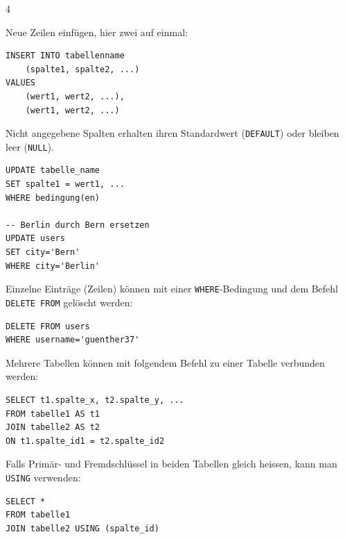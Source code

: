 \begin{landscape}
\begin{multicols*}{4}
\begin{cheatSheetBox}[title=Daten einfügen: \texorpdfstring{\lstinline|INSERT INTO|}{INSERT INTO}]
Neue Zeilen einfügen, hier zwei auf einmal:
\begin{lstlisting}
INSERT INTO tabellenname
	(spalte1, spalte2, ...)
VALUES
	(wert1, wert2, ...),
	(wert1, wert2, ...)
\end{lstlisting}
Nicht angegebene Spalten erhalten ihren Standardwert (\lstinline|DEFAULT|) oder bleiben leer (\lstinline|NULL|).
\end{cheatSheetBox}

\begin{cheatSheetBox}[title=Daten verändern: \texorpdfstring{\lstinline|UPDATE|}{UPDATE}]
\begin{lstlisting}
UPDATE tabelle_name
SET spalte1 = wert1, ...
WHERE bedingung(en)

-- Berlin durch Bern ersetzen
UPDATE users
SET city='Bern'
WHERE city='Berlin'
\end{lstlisting}
\end{cheatSheetBox}

\begin{cheatSheetBox}[title=Einträge löschen: \texorpdfstring{\lstinline|DELETE FROM|}{DELETE FROM}]
Einzelne Einträge (Zeilen) können mit einer \lstinline|WHERE|-Bedingung und dem Befehl \lstinline|DELETE FROM| gelöscht werden:
\begin{lstlisting}
DELETE FROM users
WHERE username='guenther37'
\end{lstlisting}
\end{cheatSheetBox}

\begin{cheatSheetBox}[title=Mehrere Tabellen verbinden: \texorpdfstring{\lstinline|JOIN|}{JOIN}]
Mehrere Tabellen können mit folgendem Befehl zu einer Tabelle verbunden werden:

\begin{lstlisting}
SELECT t1.spalte_x, t2.spalte_y, ...
FROM tabelle1 AS t1
JOIN tabelle2 AS t2
ON t1.spalte_id1 = t2.spalte_id2
\end{lstlisting}

Falls Primär- und Fremdschlüssel in beiden Tabellen gleich heissen, kann man \lstinline|USING| verwenden:
\begin{lstlisting}
SELECT *
FROM tabelle1
JOIN tabelle2 USING (spalte_id)
\end{lstlisting}
\end{cheatSheetBox}


\end{multicols*}
\end{landscape}

